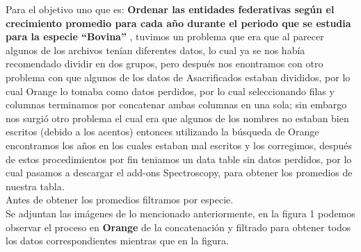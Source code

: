 \item Para el objetivo uno que es: {\bfseries Ordenar las entidades federativas según el crecimiento promedio para cada año durante el periodo que se estudia para la especie “Bovina”} , tuvimos un problema que era que al parecer algunos de los archivos tenían diferentes datos, lo cual ya se nos había recomendado dividir en dos grupos, pero después nos enontramos con otro problema con que algunos de los datos de Asacrificados estaban divididos, por lo cual Orange lo tomaba como datos perdidos, por lo cual seleccionando filas y columnas terminamos por concatenar ambas columnas en una sola; sin embargo nos surgió otro problema el cual era que algunos de los nombres no estaban bien escritos (debido a los acentos) entonces utilizando la búsqueda de Orange encontramos los años en los cuales estaban mal escritos y los corregimos, después de estos procedimientos por fin teniamos un data table sin datos perdidos, por lo cual pasamos a descargar el add-ons Spectroscopy, para obtener los promedios de nuestra tabla. \\
Antes de obtener los promedios filtramos por especie.\\
Se adjuntan las imágenes de lo mencionado anteriormente, en la figura 1 podemos observar el proceso en {\bfseries Orange } de la concatenación y filtrado para obtener todos los datos correspondientes mientras que en la figura. 
